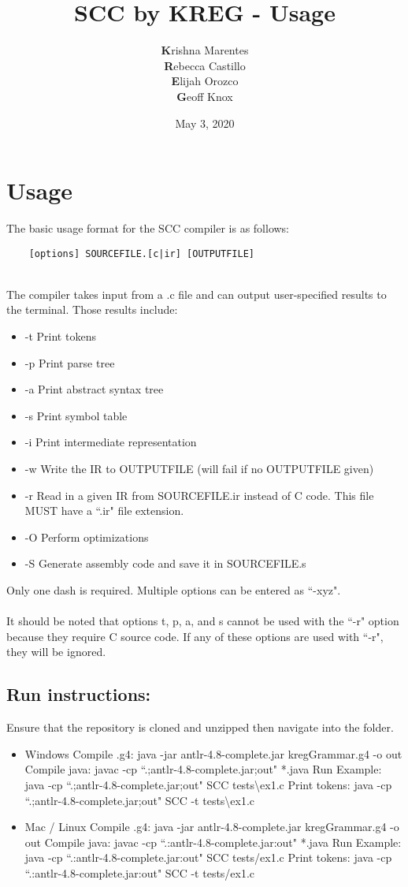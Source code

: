 \documentclass{article}
\title{SCC by KREG - Usage}
\author{\textbf{K}rishna Marentes\\\textbf{R}ebecca Castillo\\\textbf{E}lijah Orozco\\\textbf{G}eoff Knox}
\date{May 3, 2020}
\begin{document}
\maketitle

\section{Usage}
The basic usage format for the SCC compiler is as follows:
\begin{verbatim}
    [options] SOURCEFILE.[c|ir] [OUTPUTFILE]
\end{verbatim}
\\
The compiler takes input from a .c file and can output user-specified results to the terminal. Those results include:
\begin{itemize}
    \item -t Print tokens
    \item -p Print parse tree
    \item -a Print abstract syntax tree
    \item -s Print symbol table
    \item -i Print intermediate representation
    \item -w Write the IR to OUTPUTFILE (will fail if no OUTPUTFILE given)
    \item -r Read in a given IR from SOURCEFILE.ir instead of C
    code. This file MUST have a ``.ir" file extension.
    \item -O Perform optimizations
    \item -S Generate assembly code and save it in SOURCEFILE.s
\end{itemize}
Only one dash is required. Multiple options can be entered as ``-xyz".\\
\\
It should be noted that options t, p, a, and s cannot be used with the ``-r" option because they require C source code.
If any of these options are used with ``-r", they will be ignored.


\subsection{Run instructions:}
Ensure that the repository is cloned and unzipped then navigate into the folder.
\begin{itemize}
    \item Windows
        \subitem Compile .g4: java -jar antlr-4.8-complete.jar kregGrammar.g4 -o out
        \subitem Compile java: javac -cp ``.;antlr-4.8-complete.jar;out" *.java
        \subitem Run Example: java -cp ``.;antlr-4.8-complete.jar;out" SCC tests\textbackslash ex1.c
        \subitem Print tokens: java -cp ``.;antlr-4.8-complete.jar;out" SCC -t tests\textbackslash ex1.c
    \item Mac / Linux
        \subitem Compile .g4: java -jar antlr-4.8-complete.jar kregGrammar.g4 -o out
        \subitem Compile java: javac -cp ``.:antlr-4.8-complete.jar:out" *.java
        \subitem Run Example: java -cp ``.:antlr-4.8-complete.jar:out" SCC tests/ex1.c
        \subitem Print tokens: java -cp ``.:antlr-4.8-complete.jar:out" SCC -t tests/ex1.c
\end{itemize}
\end{document}
